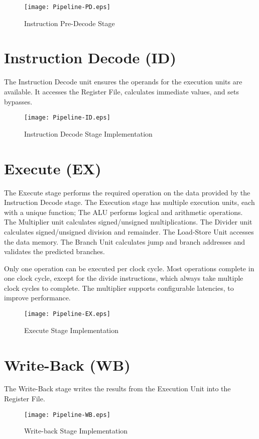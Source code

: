 \begin{figure}[th]
  \texttt{[image: Pipeline-PD.eps]}
  \caption{Instruction Pre-Decode Stage}
\end{figure}

\pagebreak

\section{Instruction Decode (ID)}\label{instruction-decode-id-1}

The Instruction Decode unit ensures the operands for the execution units
are available. It accesses the Register File, calculates immediate
values, and sets bypasses.

\begin{figure}[h]
  \texttt{[image: Pipeline-ID.eps]}
  \caption{Instruction Decode Stage Implementation}
\end{figure}

\pagebreak

\section{Execute (EX)}\label{execute-ex-1}

The Execute stage performs the required operation on the data provided by the Instruction Decode stage. The Execution stage has multiple execution units, each with a unique function;
The ALU performs logical and arithmetic operations.
The Multiplier unit calculates signed/unsigned multiplications.
The Divider unit calculates signed/unsigned division and remainder.
The Load-Store Unit accesses the data memory.
The Branch Unit calculates jump and branch addresses and validates the predicted branches.

Only one operation can be executed per clock cycle.
Most operations complete in one clock cycle, except for the divide instructions, which always take multiple clock cycles to complete. The multiplier supports configurable latencies, to improve performance.


\begin{figure}[h]
  \texttt{[image: Pipeline-EX.eps]}
  \caption{Execute Stage Implementation}
\end{figure}

\pagebreak

\section{Write-Back (WB)}\label{write-back-wb-1}

The Write-Back stage writes the results from the Execution Unit into the Register File.

\begin{figure}[h]
  \texttt{[image: Pipeline-WB.eps]}
  \caption{Write-back Stage Implementation}
\end{figure}
